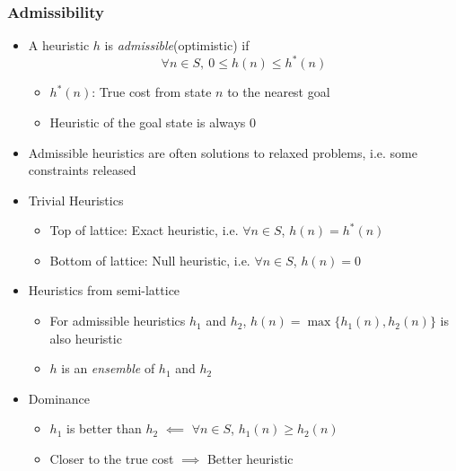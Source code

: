 \subsubsection*{Admissibility}
\begin{itemize}
    \item A heuristic $h$ is \textit{admissible}(optimistic) if
    \begin{equation}
        \forall n\in S,~0\leq h(n)\leq h^\ast(n)
    \end{equation}
    \begin{itemize}
        \item $h^\ast(n)$: True cost from state $n$ to the nearest goal
        \item Heuristic of the goal state is always $0$
    \end{itemize}
    \item Admissible heuristics are often solutions to relaxed problems, i.e. some constraints released
    \item Trivial Heuristics
    \begin{itemize}
        \item Top of lattice: Exact heuristic, i.e. $\forall n\in S$, $h(n)=h^\ast(n)$
        \item Bottom of lattice: Null heuristic, i.e. $\forall n\in S$, $h(n)=0$
    \end{itemize}
    \item Heuristics from semi-lattice
    \begin{itemize}
        \item For admissible heuristics $h_1$ and $h_2$, $h(n)=\max\{h_1(n),h_2(n)\}$ is also heuristic
        \item $h$ is an \textit{ensemble} of $h_1$ and $h_2$
    \end{itemize}
    \item Dominance
    \begin{itemize}
        \item $h_1$ is better than $h_2$ $\impliedby$ $\forall n\in S$, $h_1(n)\geq h_2(n)$
        \item Closer to the true cost $\implies$ Better heuristic
    \end{itemize}
\end{itemize}

